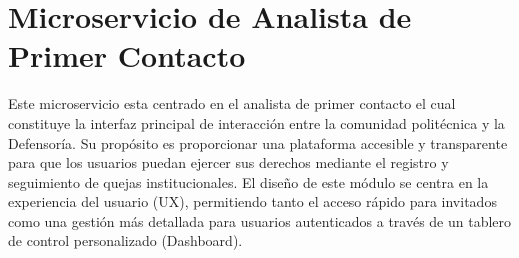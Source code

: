 
\section{Microservicio de Analista de Primer Contacto}
\label{sec:modulo_analista_primer_contacto}

Este microservicio esta centrado en el analista de primer contacto el cual constituye la interfaz principal de interacción entre la comunidad politécnica y la Defensoría. 
Su propósito es proporcionar una plataforma accesible y transparente para que los usuarios puedan ejercer sus derechos mediante el registro y seguimiento de quejas institucionales. El diseño de este módulo se centra en la experiencia del usuario (UX), permitiendo tanto el acceso rápido para invitados como una gestión más detallada para usuarios autenticados a través de un tablero de control personalizado (Dashboard).


%
%
%
%